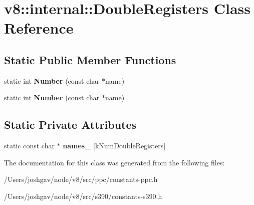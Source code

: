 \hypertarget{classv8_1_1internal_1_1_double_registers}{}\section{v8\+:\+:internal\+:\+:Double\+Registers Class Reference}
\label{classv8_1_1internal_1_1_double_registers}
\subsection*{Static Public Member Functions}
\begin{DoxyCompactItemize}
\item 
static int {\bfseries Number} (const char $\ast$name)\hypertarget{classv8_1_1internal_1_1_double_registers_a97681106e21ce37ae8a26ea488ef7dda}{}\label{classv8_1_1internal_1_1_double_registers_a97681106e21ce37ae8a26ea488ef7dda}

\item 
static int {\bfseries Number} (const char $\ast$name)\hypertarget{classv8_1_1internal_1_1_double_registers_a97681106e21ce37ae8a26ea488ef7dda}{}\label{classv8_1_1internal_1_1_double_registers_a97681106e21ce37ae8a26ea488ef7dda}

\end{DoxyCompactItemize}
\subsection*{Static Private Attributes}
\begin{DoxyCompactItemize}
\item 
static const char $\ast$ {\bfseries names\+\_\+} \mbox{[}k\+Num\+Double\+Registers\mbox{]}\hypertarget{classv8_1_1internal_1_1_double_registers_a062d2847998a02a8956b5afbb582a65f}{}\label{classv8_1_1internal_1_1_double_registers_a062d2847998a02a8956b5afbb582a65f}

\end{DoxyCompactItemize}


The documentation for this class was generated from the following files\+:\begin{DoxyCompactItemize}
\item 
/\+Users/joshgav/node/v8/src/ppc/constants-\/ppc.\+h\item 
/\+Users/joshgav/node/v8/src/s390/constants-\/s390.\+h\end{DoxyCompactItemize}
